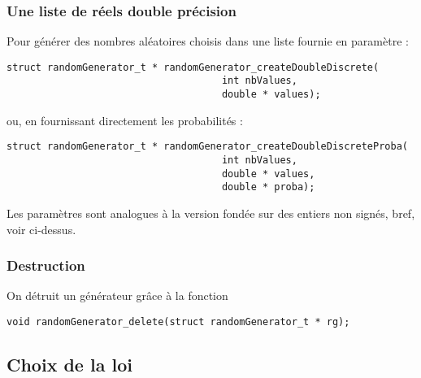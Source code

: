 \documentclass{article}
\begin{document}
\begin{verbatim}
\end{verbatim}

%
\subsubsection{Une liste de réels double précision}

   Pour générer des nombres aléatoires choisis dans une liste fournie
en paramètre :

\begin{verbatim}
struct randomGenerator_t * randomGenerator_createDoubleDiscrete(
                                     int nbValues,
                                     double * values);
\end{verbatim}

   ou, en fournissant directement les probabilités :

\begin{verbatim}
struct randomGenerator_t * randomGenerator_createDoubleDiscreteProba(
                                     int nbValues,
                                     double * values,
                                     double * proba);
\end{verbatim}

   Les paramètres sont analogues à la version fondée sur des entiers
non signés, bref, voir ci-dessus.

%
\subsubsection{Destruction}

   On détruit un générateur grâce à la fonction

\begin{verbatim}
void randomGenerator_delete(struct randomGenerator_t * rg);
\end{verbatim}

%
\subsection{Choix de la loi}
\end{document}
